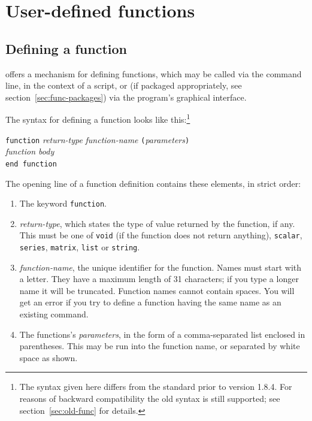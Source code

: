 \chapter{User-defined functions}
\label{chap:functions}

\section{Defining a function}
\label{func-define}

 offers a mechanism for defining functions, which may be
called via the command line, in the context of a script, or (if
packaged appropriately, see section~\ref{sec:func-packages}) via the
program's graphical interface.

The syntax for defining a function looks like this:\footnote{The
  syntax given here differs from the standard prior to 
  version 1.8.4.  For reasons of backward compatibility the old syntax
  is still supported; see section~\ref{sec:old-func} for details.}

\begin{raggedright}
\texttt{function} \textsl{return-type} \textsl{function-name}
\texttt{(}\textsl{parameters}\texttt{)} \\
\qquad  \textsl{function body} \\
\texttt{end function}
\end{raggedright}

The opening line of a function definition contains these elements, in
strict order:

\begin{enumerate}
\item The keyword \texttt{function}.
\item \textsl{return-type}, which states the type of value returned by
  the function, if any.  This must be one of \texttt{void} (if the
  function does not return anything), \texttt{scalar},
  \texttt{series}, \texttt{matrix}, \texttt{list} or \texttt{string}.
\item \textsl{function-name}, the unique identifier for the
  function.  Names must start with a letter. They have a maximum
  length of 31 characters; if you type a longer name it will be
  truncated.  Function names cannot contain spaces.  You will get an
  error if you try to define a function having the same name as an
  existing  command.
\item The functions's \textsl{parameters}, in the form of a
  comma-separated list enclosed in parentheses.  This may be run
  into the function name, or separated by white space as shown.
\end{enumerate}

